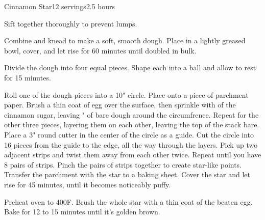 \documentclass[../Cookbook.tex]{subfiles}
\begin{document}
\begin{recipe}[CinnamonStar]{Cinnamon Star}{12 servings}{2.5 hours}

Sift together thoroughly to prevent lumps.

Combine and knead to make a soft, smooth dough.
Place in a lightly greased bowl, cover, and let rise for 60 minutes until doubled in bulk.

Divide the dough into four equal pieces.
Shape each into a ball and allow to rest for 15 minutes.

Roll one of the dough pieces into a 10" circle.
Place onto a piece of parchment paper.
Brush a thin coat of egg over the surface, then sprinkle with  of the cinnamon sugar, leaving " of bare dough around the circumfrence.
Repeat for the other three pieces, layering them on each other, leaving the top of the stack bare.
Place a 3" round cutter in the center of the circle as a guide.
Cut the circle into 16 pieces from the guide to the edge, all the way through the layers.
Pick up two adjacent strips and twist them away from each other twice.
Repeat until you have 8 pairs of strips.
Pinch the pairs of strips together to create star-like points.
Transfer the parchment with the star to a baking sheet.
Cover the star and let rise for 45 minutes, until it becomes noticeably puffy.

Preheat oven to 400\0F.
Brush the whole star with a thin coat of the beaten egg.
Bake for 12 to 15 minutes until it's golden brown.

\end{recipe}
\end{document}
